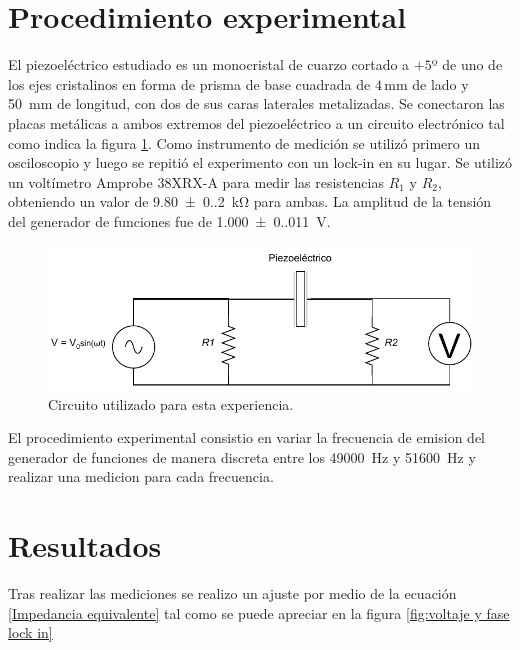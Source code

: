 \documentclass{article}
\begin{document}
\section{Procedimiento experimental}
El piezoeléctrico estudiado es un monocristal de cuarzo cortado a $+5$º de uno
de los ejes cristalinos en forma de prisma de base cuadrada de $4$\,mm de lado
y \SI{50}{\milli m} de longitud, con dos de sus caras laterales metalizadas. Se
conectaron las placas metálicas a ambos extremos del piezoeléctrico a un
circuito electrónico tal como indica la figura \ref{Circuito piezoeléctrico}.
Como instrumento de medición se utilizó primero un osciloscopio y luego se
repitió el experimento con un lock-in en su lugar. Se utilizó un voltímetro
Amprobe 38XRX-A para medir las resistencias $R_1$ y $R_2$, obteniendo un valor
de  \SI{9.80(0.20)}{\kilo \ohm} para ambas. La amplitud de la tensión del
generador de funciones fue de \SI{1.000(0.011)}{V}.

\begin{figure}[H]
    \centering
    \includegraphics[width=16.5cm]{Circuito piezoelÃ©ctrico.drawio.pdf}
    \caption{Circuito utilizado para esta experiencia.}
    \label{Circuito piezoeléctrico}
\end{figure}


El procedimiento experimental consistio en variar la frecuencia de emision del
generador de funciones de manera discreta entre los \SI{49000}{Hz} y
\SI{51600}{Hz} y realizar una medicion para cada frecuencia. 

\section{Resultados}

Tras realizar las mediciones se realizo un ajuste por medio de la ecuación
\ref{Impedancia equivalente} tal como se puede apreciar en la figura
\ref{fig:voltaje y fase lock in}
\end{document}
